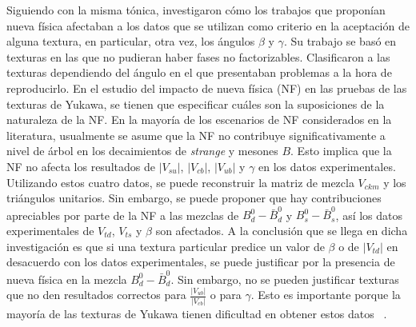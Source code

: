 Siguiendo con la misma t\'onica, investigaron c\'omo los trabajos que 
propon\'ian nueva f\'isica afectaban a los datos que se utilizan como criterio
en la aceptaci\'on de alguna textura, en particular, otra vez, los \'angulos 
$\beta$ y $\gamma$. Su trabajo se bas\'o en texturas en las que no pudieran 
haber fases no factorizables. Clasificaron a las texturas dependiendo del 
\'angulo en el que presentaban problemas a la hora de reproducirlo. En el 
estudio del impacto de nueva f\'isica (NF) en las pruebas de las texturas de 
Yukawa, se tienen que especificar cu\'ales son la suposiciones de la naturaleza
de la NF. En la mayor\'ia de los escenarios de NF considerados en la literatura,
usualmente se asume que la NF no contribuye significativamente a  nivel de 
\'arbol en los decaimientos de {\it strange} y mesones $B$. Esto implica que la
NF no afecta los resultados de $|V_{su}|$, $|V_{cb}|$, $|V_{ub}|$ y $\gamma$ en
los datos experimentales. Utilizando estos cuatro datos, se puede reconstruir la
matriz de mezcla $V_{ckm}$ y los tri\'angulos unitarios. Sin embargo, se puede 
proponer que hay contribuciones apreciables por parte de la NF a las mezclas de
$B^0_d-\bar B^0_d$ y $B^0_s-\bar B^0_s$, as\'i los datos experimentales de 
$V_{td}$, $V_{ts}$ y $\beta$ son afectados. A la conclusi\'on que se llega en 
dicha investigaci\'on es que si una textura particular predice un valor de 
$\beta$ o de $|V_{td}|$ en desacuerdo con los datos experimentales, se puede 
justificar por la presencia de nueva f\'isica en la mezcla $B^0_d-\bar B^0_d$. 
Sin embargo, no se pueden justificar texturas que no den resultados correctos 
para $\frac{|V_{ub}|}{|V_{cb}|}$ o para $\gamma$. Esto es importante porque la 
mayor\'ia de las texturas de Yukawa tienen dificultad en obtener estos datos 
~\cite{Bra200601}.

